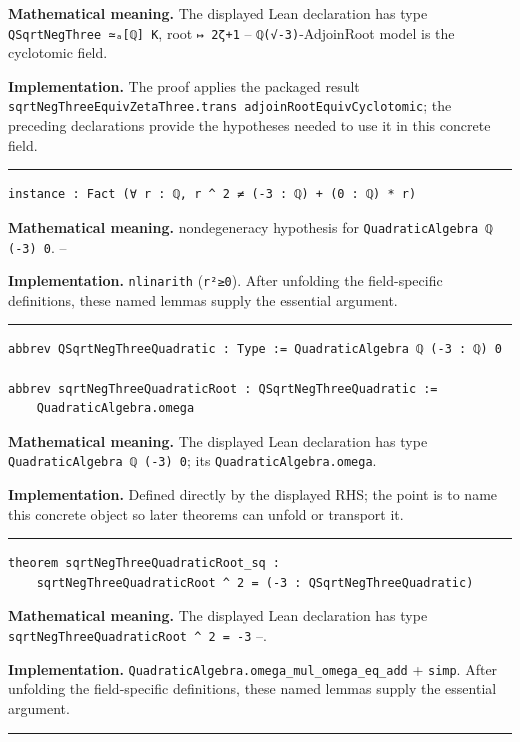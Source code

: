 \documentclass[UTF8,a4paper,11pt,fontset=fandol]{ctexart}
\theoremstyle{definition}
\newcommand{\statementsep}{\par\medskip\hrule\medskip}
\begin{document}
\noindent\textbf{Mathematical meaning.} The displayed Lean declaration has type \texttt{QSqrtNegThree ≃ₐ[ℚ] K}, root \texttt{↦ 2ζ+1} -- \texttt{ℚ(√-3)}-AdjoinRoot model is the cyclotomic field.\par
\noindent\textbf{Implementation.} The proof applies the packaged result \texttt{sqrtNegThreeEquivZetaThree.\allowbreak{}trans adjoinRootEquivCyclotomic}; the preceding declarations provide the hypotheses needed to use it in this concrete field.\par
\statementsep
\begin{verbatim}
instance : Fact (∀ r : ℚ, r ^ 2 ≠ (-3 : ℚ) + (0 : ℚ) * r)
\end{verbatim}
\noindent\textbf{Mathematical meaning.} nondegeneracy hypothesis for \texttt{QuadraticAlgebra ℚ (-3) 0}. --\par
\noindent\textbf{Implementation.} \texttt{nlinarith} (\texttt{r²≥0}). After unfolding the field-specific definitions, these named lemmas supply the essential argument.\par
\statementsep
\begin{verbatim}
abbrev QSqrtNegThreeQuadratic : Type := QuadraticAlgebra ℚ (-3 : ℚ) 0

abbrev sqrtNegThreeQuadraticRoot : QSqrtNegThreeQuadratic :=
    QuadraticAlgebra.omega
\end{verbatim}
\noindent\textbf{Mathematical meaning.} The displayed Lean declaration has type \texttt{QuadraticAlgebra ℚ (-3) 0}; its \texttt{QuadraticAlgebra.\allowbreak{}omega}.\par
\noindent\textbf{Implementation.} Defined directly by the displayed RHS; the point is to name this concrete object so later theorems can unfold or transport it.\par
\statementsep
\begin{verbatim}
theorem sqrtNegThreeQuadraticRoot_sq :
    sqrtNegThreeQuadraticRoot ^ 2 = (-3 : QSqrtNegThreeQuadratic)
\end{verbatim}
\noindent\textbf{Mathematical meaning.} The displayed Lean declaration has type \texttt{sqrtNegThreeQuadraticRoot \textasciicircum{} 2 = -3} --.\par
\noindent\textbf{Implementation.} \texttt{QuadraticAlgebra.\allowbreak{}omega\_\allowbreak{}mul\_\allowbreak{}omega\_\allowbreak{}eq\_\allowbreak{}add} + \texttt{simp}. After unfolding the field-specific definitions, these named lemmas supply the essential argument.\par
\statementsep
\end{document}
